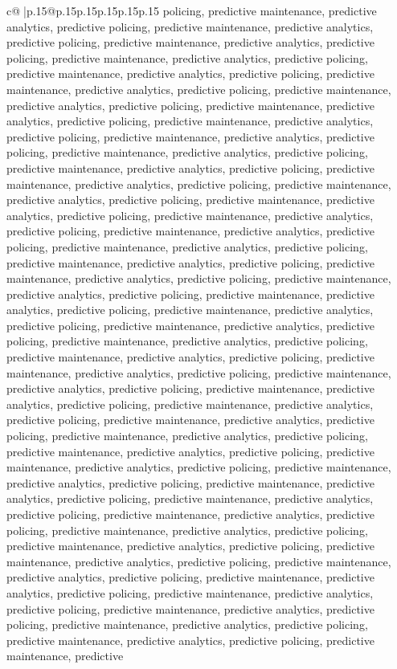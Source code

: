 \documentclass{article}
\begin{document}
{\begin{supertabular}{c@{$\;$}|p{.15\linewidth}@{}p{.15\linewidth}p{.15\linewidth}p{.15\linewidth}p{.15\linewidth}p{.15\linewidth}}
{{{policing, predictive maintenance, predictive analytics, predictive policing, predictive maintenance, predictive analytics, predictive policing, predictive maintenance, predictive analytics, predictive policing, predictive maintenance, predictive analytics, predictive policing, predictive maintenance, predictive analytics, predictive policing, predictive maintenance, predictive analytics, predictive policing, predictive maintenance, predictive analytics, predictive policing, predictive maintenance, predictive analytics, predictive policing, predictive maintenance, predictive analytics, predictive policing, predictive maintenance, predictive analytics, predictive policing, predictive maintenance, predictive analytics, predictive policing, predictive maintenance, predictive analytics, predictive policing, predictive maintenance, predictive analytics, predictive policing, predictive maintenance, predictive analytics, predictive policing, predictive maintenance, predictive analytics, predictive policing, predictive maintenance, predictive analytics, predictive policing, predictive maintenance, predictive analytics, predictive policing, predictive maintenance, predictive analytics, predictive policing, predictive maintenance, predictive analytics, predictive policing, predictive maintenance, predictive analytics, predictive policing, predictive maintenance, predictive analytics, predictive policing, predictive maintenance, predictive analytics, predictive policing, predictive maintenance, predictive analytics, predictive policing, predictive maintenance, predictive analytics, predictive policing, predictive maintenance, predictive analytics, predictive policing, predictive maintenance, predictive analytics, predictive policing, predictive maintenance, predictive analytics, predictive policing, predictive maintenance, predictive analytics, predictive policing, predictive maintenance, predictive analytics, predictive policing, predictive maintenance, predictive analytics, predictive policing, predictive maintenance, predictive analytics, predictive policing, predictive maintenance, predictive analytics, predictive policing, predictive maintenance, predictive analytics, predictive policing, predictive maintenance, predictive analytics, predictive policing, predictive maintenance, predictive analytics, predictive policing, predictive maintenance, predictive analytics, predictive policing, predictive maintenance, predictive analytics, predictive policing, predictive maintenance, predictive analytics, predictive policing, predictive maintenance, predictive analytics, predictive policing, predictive maintenance, predictive analytics, predictive policing, predictive maintenance, predictive analytics, predictive policing, predictive maintenance, predictive analytics, predictive policing, predictive maintenance, predictive analytics, predictive policing, predictive maintenance, predictive analytics, predictive policing, predictive maintenance, predictive analytics, predictive policing, predictive maintenance, predictive analytics, predictive policing, predictive maintenance, predictive analytics, predictive policing, predictive maintenance, predictive }}}
\end{supertabular}}
\end{document}
